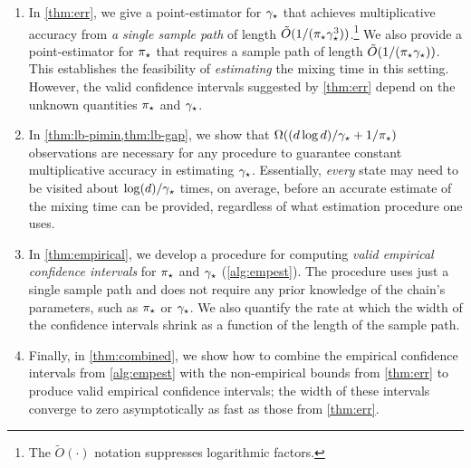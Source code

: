 \begin{enumerate}
  \item
    In \cref{thm:err}, we give a point-estimator for $\gamma_{\star}$ that
    achieves multiplicative accuracy from \emph{a single sample path}
    of length $\tilde{O}(1/(\pi_{\star}\gamma_{\star}^3))$.\footnote{The
    $\tilde{O}(\cdot)$ notation suppresses logarithmic factors.}
    We also provide a point-estimator for $\pi_{\star}$ that requires a sample
    path of length $\tilde{O}(1/(\pi_{\star}\gamma_{\star}))$.
    This establishes the feasibility of \emph{estimating} the mixing
    time in this setting.
    However, the valid confidence intervals suggested by
    \cref{thm:err} depend on the unknown quantities $\pi_{\star}$ and
    $\gamma_{\star}$.

  \item
    In \cref{thm:lb-pimin,thm:lb-gap}, we show that $\Omega(
    (d\log d)/\gamma_{\star} + 1/\pi_{\star})$ observations are necessary for any
    procedure to guarantee constant multiplicative accuracy in
    estimating $\gamma_{\star}$.
    Essentially, \emph{every} state may need to be visited about
    $\log(d)/\gamma_{\star}$ times, on average, before an accurate estimate of
    the mixing time can be provided, regardless of what
    estimation procedure one uses.
    
  \item
    In \cref{thm:empirical}, we develop a procedure for computing
    \emph{valid empirical confidence intervals} for $\pi_{\star}$ and
    $\gamma_{\star}$ (\cref{alg:empest}).
    The procedure uses just a single sample path and does not require
    any prior knowledge of the chain's parameters, such as $\pi_{\star}$ or $\gamma_{\star}$.
    We also quantify the rate at which the width of the confidence
    intervals shrink as a function of the length of the sample path.

  \item
    Finally, in \cref{thm:combined}, we show how to combine the
    empirical confidence intervals from \cref{alg:empest} with the
    non-empirical bounds from \cref{thm:err} to produce valid
    empirical confidence intervals;
    the width of these intervals converge to zero asymptotically as
    fast as those from \cref{thm:err}.



    

\end{enumerate}

